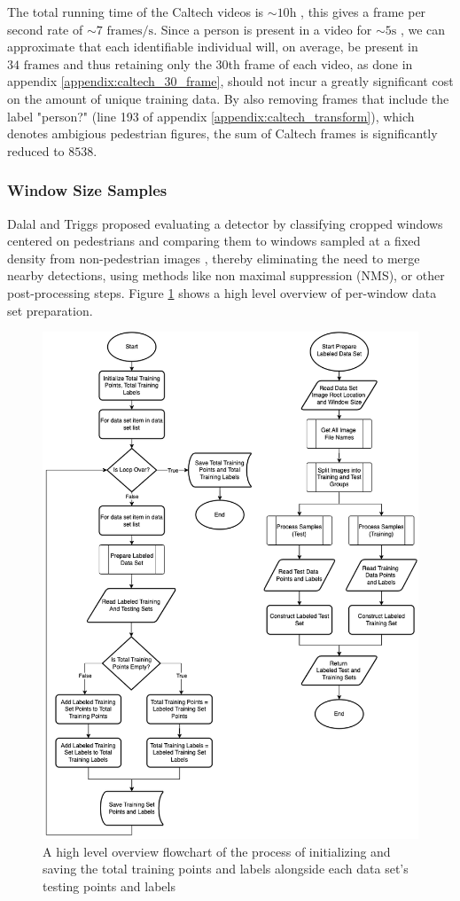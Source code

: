     The total running time of the Caltech videos is $\sim 10\mathrm{h}$ \cite{dollar_2009_pedestrian}, this gives a frame per second rate of $\sim 7 \text{ frames}/\mathrm{s}$. Since a person is present in a video for $\sim 5 \mathrm{s}$ \cite{dollar_2009_pedestrian}, we can approximate that each identifiable individual will, on average, be present in $34 \text{ frames}$ and thus retaining only the $30$th frame of each video, as done in appendix \ref{appendix:caltech_30_frame}, should not incur a greatly significant cost on the amount of unique training data. By also removing frames that include the label "person?" (line 193 of appendix \ref{appendix:caltech_transform}), which denotes ambigious pedestrian figures, the sum of Caltech frames is significantly reduced to $8538$.

    \subsubsection{Window Size Samples}

    Dalal and Triggs proposed evaluating a detector by classifying cropped windows centered on pedestrians and comparing them to windows sampled at a fixed density from non-pedestrian images \cite{dalal_2005_histograms}, thereby eliminating the need to merge nearby detections, using methods like non maximal suppression (NMS), or other post-processing steps. Figure \ref{fig:dataset_high} shows a high level overview of per-window data set preparation.

    \begin{figure}
        \centering
        \includegraphics[width=0.75\linewidth]{images/ee_dataset_high.drawio.png}
        \caption{A high level overview flowchart of the process of initializing and saving the total training points and labels alongside each data set's testing points and labels}
        \label{fig:dataset_high}
    \end{figure}


